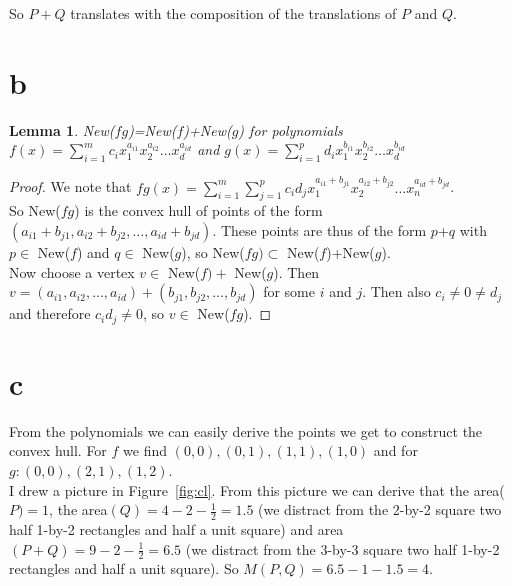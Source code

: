 \documentclass[paper=a4, fontsize=11pt]{scrartcl} %
\theoremstyle{plain}
\newtheorem{lemma}{Lemma}
\begin{document}
So $P+Q$ translates with the composition of the translations of $P$ and $Q$.

\section{b}
\begin{lemma}
New($fg$)=New($f$)+New($g$) for polynomials $f(x)=\sum_{i=1}^{m}{c_{i}x_{1}^{a_{i1}}x_{2}^{a_{i2}}\ldots x_{d}^{a_{id}}}$ and $g(x)=\sum_{i=1}^{p}{d_{i}x_{1}^{b_{i1}}x_{2}^{b_{i2}}\ldots x_{d}^{b_{id}}}$
\end{lemma}
\begin{proof}
We note that $fg(x)=\sum_{i=1}^{m}\sum_{j=1}^{p}{c_{i}d_{j}x_{1}^{a_{i1}+b_{j1}}x_{2}^{a_{i2}+b_{j2}}\ldots x_{n}^{a_{id}+b_{jd}}}$.\\
So New($fg$) is the convex hull of points of the form $(a_{i1}+b_{j1},a_{i2}+b_{j2},\ldots,a_{id}+b_{jd})$.
These points are thus of the form $p$+$q$ with $p\in$ New($f$) and $q\in$ New($g$), so New($fg)\subset$ New($f$)+New($g$).\\

Now choose a vertex $v\in$ New($f) +$ New($g$). Then $v=(a_{i1},a_{i2},\ldots,a_{id}) + (b_{j1},b_{j2},\ldots,b_{jd})$ for some $i$ and $j$. Then also $c_{i}\neq 0 \neq d_{j}$ and therefore $c_{i}d_{j}\neq0$, so $v\in$ New($fg$).
\end{proof}

\section{c}
From the polynomials we can easily derive the points we get to construct the convex hull. For $f$ we find $(0,0),(0,1),(1,1),(1,0)$ and for $g:(0,0),(2,1),(1,2)$.\\
I drew a picture in Figure~\ref{fig:cl}. From this picture we can derive that the area($P)= 1$, the area$(Q) = 4-2-\frac{1}{2} = 1.5$ (we distract from the 2-by-2 square two half 1-by-2 rectangles and half a unit square) and area$(P+Q) = 9 - 2 -\frac{1}{2} = 6.5$ (we distract from the 3-by-3 square two half 1-by-2 rectangles and half a unit square).
So $M(P,Q) = 6.5-1-1.5 = 4$.
\end{document}
